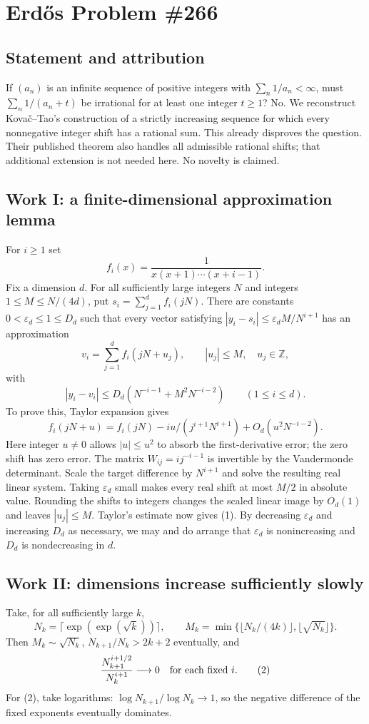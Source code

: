 \section{Erd\H{o}s Problem \#266}
\subsection{Statement and attribution}
If $(a_n)$ is an infinite sequence of positive integers with $\sum_n1/a_n<\infty$, must $\sum_n1/(a_n+t)$ be irrational for at least one integer $t\ge1$? No. We reconstruct Kova\v c--Tao's construction of a strictly increasing sequence for which every nonnegative integer shift has a rational sum. This already disproves the question. Their published theorem also handles all admissible rational shifts; that additional extension is not needed here. No novelty is claimed.

\subsection{Work I: a finite-dimensional approximation lemma}
For $i\ge1$ set
\[
 f_i(x)=\frac1{x(x+1)\cdots(x+i-1)}.
\]
Fix a dimension $d$. For all sufficiently large integers $N$ and integers $1\le M\le N/(4d)$, put $s_i=\sum_{j=1}^df_i(jN)$. There are constants $0<\varepsilon_d\le1\le D_d$ such that every vector satisfying
$|y_i-s_i|\le\varepsilon_d M/N^{i+1}$ has an approximation
\[
 v_i=\sum_{j=1}^df_i(jN+u_j),\qquad |u_j|\le M,\quad u_j\in\mathbb Z,
\]
with
\[
 |y_i-v_i|\le D_d(N^{-i-1}+M^2N^{-i-2})\qquad(1\le i\le d).
 \tag{1}
\]
To prove this, Taylor expansion gives
\[
 f_i(jN+u)=f_i(jN)-iu/(j^{i+1}N^{i+1})+O_d(u^2N^{-i-2}).
\]
Here integer $u\ne0$ allows $|u|\le u^2$ to absorb the first-derivative error; the zero shift has zero error. The matrix $W_{ij}=ij^{-i-1}$ is invertible by the Vandermonde determinant. Scale the target difference by $N^{i+1}$ and solve the resulting real linear system. Taking $\varepsilon_d$ small makes every real shift at most $M/2$ in absolute value. Rounding the shifts to integers changes the scaled linear image by $O_d(1)$ and leaves $|u_j|\le M$. Taylor's estimate now gives (1). By decreasing $\varepsilon_d$ and increasing $D_d$ as necessary, we may and do arrange that $\varepsilon_d$ is nonincreasing and $D_d$ is nondecreasing in $d$.

\subsection{Work II: dimensions increase sufficiently slowly}
Take, for all sufficiently large $k$,
\[
 N_k=\lceil\exp(\exp(\sqrt{k}))\rceil,
 \qquad M_k=\min\{\lfloor N_k/(4k)\rfloor,\lfloor\sqrt{N_k}\rfloor\}.
\]
Then $M_k\sim\sqrt{N_k}$, $N_{k+1}/N_k>2k+2$ eventually, and
\[
 \frac{N_{k+1}^{i+1/2}}{N_k^{i+1}}\longrightarrow0
 \quad\hbox{for each fixed }i.
 \tag{2}
\]
For (2), take logarithms: $\log N_{k+1}/\log N_k\to1$, so the negative difference of the fixed exponents eventually dominates.

